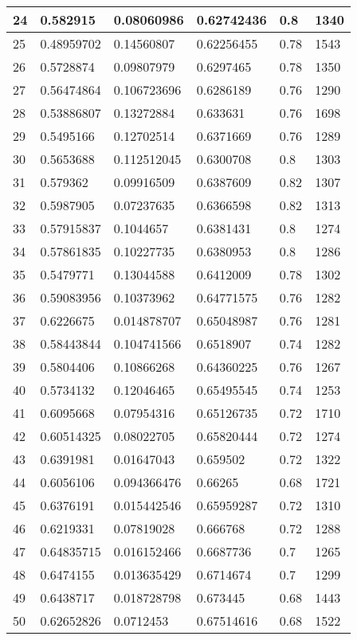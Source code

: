 \begin{longtable}{|l|l|l|l|l|l|}
24 & 0.582915 & 0.08060986 & 0.62742436 & 0.8 & 1340 \\ \hline 
25 & 0.48959702 & 0.14560807 & 0.62256455 & 0.78 & 1543 \\ \hline 
26 & 0.5728874 & 0.09807979 & 0.6297465 & 0.78 & 1350 \\ \hline 
27 & 0.56474864 & 0.106723696 & 0.6286189 & 0.76 & 1290 \\ \hline 
28 & 0.53886807 & 0.13272884 & 0.633631 & 0.76 & 1698 \\ \hline 
29 & 0.5495166 & 0.12702514 & 0.6371669 & 0.76 & 1289 \\ \hline 
30 & 0.5653688 & 0.112512045 & 0.6300708 & 0.8 & 1303 \\ \hline 
31 & 0.579362 & 0.09916509 & 0.6387609 & 0.82 & 1307 \\ \hline 
32 & 0.5987905 & 0.07237635 & 0.6366598 & 0.82 & 1313 \\ \hline 
33 & 0.57915837 & 0.1044657 & 0.6381431 & 0.8 & 1274 \\ \hline 
34 & 0.57861835 & 0.10227735 & 0.6380953 & 0.8 & 1286 \\ \hline 
35 & 0.5479771 & 0.13044588 & 0.6412009 & 0.78 & 1302 \\ \hline 
36 & 0.59083956 & 0.10373962 & 0.64771575 & 0.76 & 1282 \\ \hline 
37 & 0.6226675 & 0.014878707 & 0.65048987 & 0.76 & 1281 \\ \hline 
38 & 0.58443844 & 0.104741566 & 0.6518907 & 0.74 & 1282 \\ \hline 
39 & 0.5804406 & 0.10866268 & 0.64360225 & 0.76 & 1267 \\ \hline 
40 & 0.5734132 & 0.12046465 & 0.65495545 & 0.74 & 1253 \\ \hline 
41 & 0.6095668 & 0.07954316 & 0.65126735 & 0.72 & 1710 \\ \hline 
42 & 0.60514325 & 0.08022705 & 0.65820444 & 0.72 & 1274 \\ \hline 
43 & 0.6391981 & 0.01647043 & 0.659502 & 0.72 & 1322 \\ \hline 
44 & 0.6056106 & 0.094366476 & 0.66265 & 0.68 & 1721 \\ \hline 
45 & 0.6376191 & 0.015442546 & 0.65959287 & 0.72 & 1310 \\ \hline 
46 & 0.6219331 & 0.07819028 & 0.666768 & 0.72 & 1288 \\ \hline 
47 & 0.64835715 & 0.016152466 & 0.6687736 & 0.7 & 1265 \\ \hline 
48 & 0.6474155 & 0.013635429 & 0.6714674 & 0.7 & 1299 \\ \hline 
49 & 0.6438717 & 0.018728798 & 0.673445 & 0.68 & 1443 \\ \hline 
50 & 0.62652826 & 0.0712453 & 0.67514616 & 0.68 & 1522 \\ \hline 
\end{longtable}